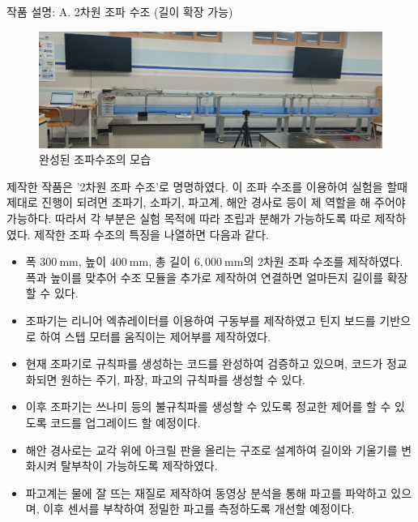 \documentclass[a0paper,portrait]{Junlam_PosterP}
\begin{document}
\begin{poster}
\begin{posterbox}[name=wtank,span=2,column=1,row=0] {작품 설명: A. 2차원 조파 수조 (길이 확장 가능)}
\begin{figure}[H]
        \includegraphics[width=\textwidth]{images/Experiment_System_Crop}
        \caption{완성된 조파수조의 모습}
        \label{Experimnet_System} 
\end{figure} 
\scriptsize 제작한 작품은 '2차원 조파 수조'로 명명하였다. 이 조파 수조를 이용하여 실험을 할때 제대로 진행이 되려면 조파기, 소파기, 파고계, 해안 경사로 등이 제 역할을 해 주어야 가능하다. 따라서 각 부분은 실험 목적에 따라 조립과 분해가 가능하도록 따로 제작하였다. 제작한 조파 수조의 특징을 나열하면 다음과 같다.
\begin{itemize}
    \item 폭 $300~\mathrm{mm}$, 높이 $400~\mathrm{mm}$, 총 길이 $6,000~\mathrm{mm}$의 2차원 조파 수조를 제작하였다. 폭과 높이를 맞추어 수조 모듈을 추가로 제작하여 연결하면 얼마든지 길이를 확장할 수 있다. 
    \item 조파기는 리니어 엑츄레이터를 이용하여 구동부를 제작하였고 틴지 보드를 기반으로 하여 스텝 모터를 움직이는 제어부를 제작하였다. 
    \item 현재 조파기로 규칙파를 생성하는 코드를 완성하여 검증하고 있으며, 코드가 정교화되면 원하는 주기, 파장, 파고의 규칙파를 생성할 수 있다. 
    \item 이후 조파기는 쓰나미 등의 불규칙파를 생성할 수 있도록 정교한 제어를 할 수 있도록 코드를 업그레이드 할 예정이다. 
    \item 해안 경사로는 교각 위에 아크릴 판을 올리는 구조로 설계하여 길이와 기울기를 변화시켜 탈부착이 가능하도록 제작하였다. 
    \item 파고계는 물에 잘 뜨는 재질로 제작하여 동영상 분석을 통해 파고를 파악하고 있으며, 이후 센서를 부착하여 정밀한 파고를 측정하도록 개선할 예정이다.
\end{itemize}


\end{posterbox}
\end{poster}
\end{document}
